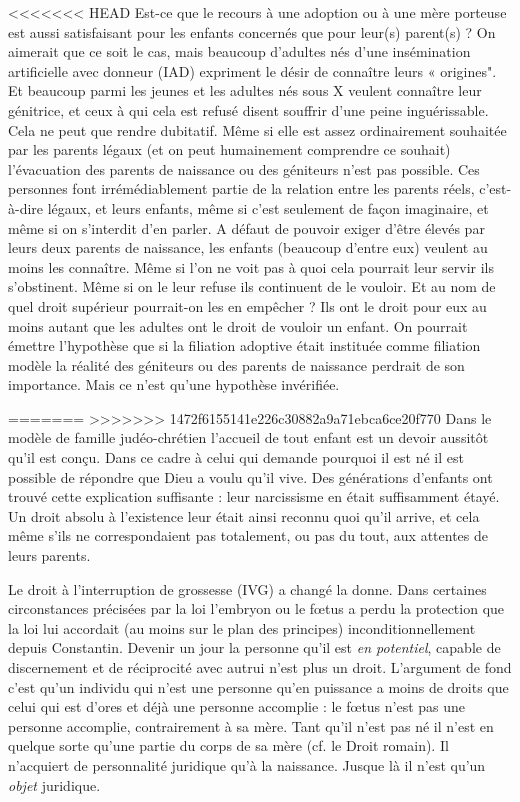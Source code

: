 <<<<<<< HEAD
 Est-ce que le recours à une adoption ou à une mère porteuse est aussi satisfaisant pour les enfants concernés que pour leur(s) parent(s) ? On aimerait que ce soit le cas, mais beaucoup d'adultes nés d'une insémination artificielle avec donneur (IAD) expriment le désir de connaître leurs « origines". Et beaucoup parmi les jeunes et les adultes nés sous X veulent connaître leur génitrice, et ceux à qui cela est refusé disent souffrir d'une peine inguérissable. Cela ne peut que rendre dubitatif. Même si elle est assez ordinairement souhaitée par les parents légaux (et on peut humainement comprendre ce souhait) l'évacuation des parents de naissance ou des géniteurs n'est pas possible. Ces personnes font irrémédiablement partie de la relation entre les parents réels, c'est-à-dire légaux, et leurs enfants, même si c'est seulement de façon imaginaire, et même si on s'interdit d'en parler. A défaut de pouvoir exiger d'être élevés par leurs deux parents de naissance, les enfants (beaucoup d'entre eux) veulent au moins les connaître.  Même si l'on ne voit pas à quoi cela pourrait leur servir ils s'obstinent. Même si on le leur refuse ils continuent de le vouloir. Et au nom de quel droit supérieur pourrait-on les en empêcher ? Ils ont le droit pour eux au moins autant que les adultes ont le droit de vouloir un enfant. On pourrait émettre l'hypothèse que si la filiation adoptive était instituée comme filiation modèle la réalité des géniteurs ou des parents de naissance perdrait de son importance. Mais ce n'est qu'une hypothèse invérifiée.
 
=======
>>>>>>> 1472f6155141e226c30882a9a71ebca6ce20f770
 Dans le modèle de famille judéo-chrétien  l'accueil de tout enfant est un devoir aussitôt qu'il est conçu. Dans ce cadre à celui qui demande pourquoi il est né il est possible de répondre que Dieu a voulu qu'il vive. Des générations d'enfants ont trouvé cette explication suffisante : leur narcissisme en était suffisamment étayé. Un droit absolu à l'existence leur était ainsi reconnu quoi qu'il arrive, et cela même s'ils ne correspondaient pas totalement, ou pas du tout, aux attentes de leurs parents.
  
 Le droit à l'interruption de grossesse (IVG) a changé la donne. Dans certaines circonstances précisées par la loi l'embryon ou le fœtus a perdu la protection que la loi lui accordait (au moins sur le plan des principes) inconditionnellement depuis Constantin. Devenir un jour la personne qu'il est \emph{en potentiel}, capable de discernement et de réciprocité avec autrui  n'est plus un droit. L'argument de fond c'est qu'un individu qui n'est une personne qu'en puissance a moins de droits que celui qui est d'ores et déjà une personne accomplie : le fœtus n'est pas une personne accomplie, contrairement à sa mère. Tant qu'il n'est pas né il n'est en quelque sorte qu'une partie du corps de sa mère (cf. le Droit romain). Il n'acquiert de personnalité juridique qu'à la naissance. Jusque là il n'est qu'un \emph{objet} juridique. 

